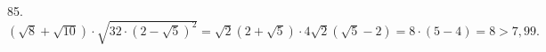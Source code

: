 85. $(\sqrt{8}+\sqrt{10})\cdot\sqrt{32\cdot(2-\sqrt{5})^2}=\sqrt{2}(2+\sqrt{5})\cdot4\sqrt{2}(\sqrt{5}-2)=8\cdot(5-4)=8>7,99.$\\

